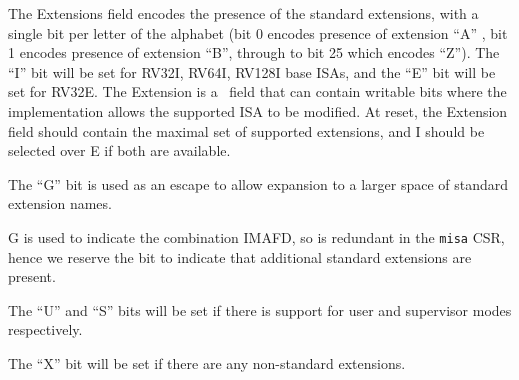 The Extensions field encodes the presence of the standard extensions,
with a single bit per letter of the alphabet (bit 0 encodes presence
of extension ``A'' , bit 1 encodes presence of extension ``B'',
through to bit 25 which encodes ``Z'').  The ``I'' bit will be set for
RV32I, RV64I, RV128I base ISAs, and the ``E'' bit will be set for
RV32E.  The Extension is a \warl\ field that can contain writable bits
where the implementation allows the supported ISA to be modified.  At
reset, the Extension field should contain the maximal set of supported
extensions, and I should be selected over E if both are available.

The ``G'' bit is used as an escape to allow expansion to a larger
space of standard extension names.
\begin{commentary}
G is used to indicate the combination IMAFD, so is redundant in the
{\tt misa} CSR, hence we reserve the bit to indicate that
additional standard extensions are present.
\end{commentary}

The ``U'' and ``S'' bits will be set if there is support for user and
supervisor modes respectively.

The ``X'' bit will be set if there are any non-standard extensions.

